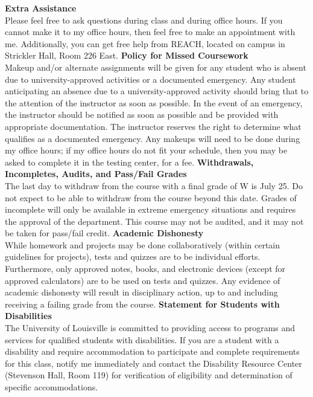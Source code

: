 \documentclass[addpoints,12pt]{exam}
\begin{document}
\wl
\noindent \textbf{Extra Assistance} \\
Please feel free to ask questions during class and during office hours. If you cannot make it to my office hours, then feel free to make an appointment with me. Additionally, you can get free help from REACH, located on campus in Strickler Hall, Room 226 East.
\wl
\noindent \textbf{Policy for Missed Coursework} \\
Makeup and/or alternate assignments will be given for any student who is absent due to university-approved activities or a documented emergency. Any student anticipating an absence due to a university-approved activity should bring that to the attention of the instructor as soon as possible. In the event of an emergency, the instructor should be notified as soon as possible and be provided with appropriate documentation. The instructor reserves the right to determine what qualifies as a documented emergency. Any makeups will need to be done during my office hours; if my office hours do not fit your schedule, then you may be asked to complete it in the testing center, for a fee.
\wl
\noindent \textbf{Withdrawals, Incompletes, Audits, and Pass/Fail Grades} \\
The last day to withdraw from the course with a final grade of W is July 25. Do not expect to be able to withdraw from the course beyond this date. Grades of incomplete will only be available in extreme emergency situations and requires the approval of the department. This course may not be audited, and it may not be taken for pass/fail credit. 
\wl
\noindent \textbf{Academic Dishonesty} \\
While homework and projects may be done collaboratively (within certain guidelines for projects), tests and quizzes are to be individual efforts. Furthermore, only approved notes, books, and electronic devices (except for approved calculators) are to be used on tests and quizzes. Any evidence of academic dishonesty will result in disciplinary action, up to and including receiving a failing grade from the course.
\wl
\noindent \textbf{Statement for Students with Disabilities} \\
The University of Louisville is committed to providing access to programs and services for qualified students with disabilities. If you are a student with a disability and require accommodation to participate and complete requirements for this class, notify me immediately and contact the Disability Resource Center (Stevenson Hall, Room 119) for verification of eligibility and determination of specific accommodations.
\end{document}
